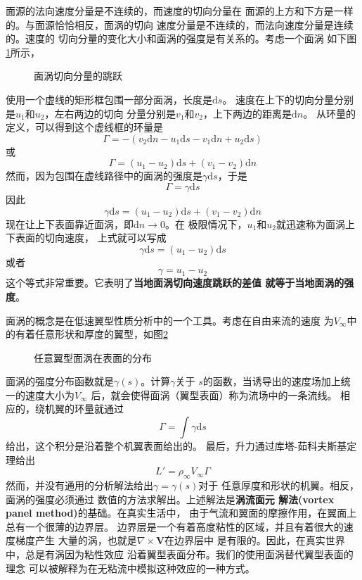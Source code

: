 面源的法向速度分量是不连续的，而速度的切向分量在
面源的上方和下方是一样的。与面源恰恰相反，面涡的切向
速度分量是不连续的，而法向速度分量是连续的。速度的
切向分量的变化大小和面涡的强度是有关系的。考虑一个面涡
如下图\ref{fig:strength_vortex}所示，
\begin{figure}[!ht]
  \centering
  
  \caption{面涡切向分量的跳跃}
  \label{fig:strength_vortex}
\end{figure}
使用一个虚线的矩形框包围一部分面涡，长度是$\mathrm{d}s $。
速度在上下的切向分量分别是$u_1$和$u_2$，左右两边的切向
分量分别是$v_1$和$v_2$，上下两边的距离是$\mathrm{d}n $。
从环量的定义，可以得到这个虚线框的环量是
\[
  \Gamma=-(v_2 \mathrm{d}n -u_1 \mathrm{d}s -v_1 \mathrm{d}n +u_2 \mathrm{d}s)
\]
或
\[
  \Gamma= (u_1-u_2) \mathrm{d}s+(v_1-v_2) \mathrm{d}n
\]
然而，因为包围在虚线路径中的面涡的强度是$\gamma \mathrm{d}s $，于是
\[
  \Gamma =\gamma \mathrm{d}s 
\]
因此
\[
  \gamma \mathrm{d} s =(u_1-u_2 )\mathrm{d}s+(v_1-v_2) \mathrm{d}n
\]
现在让上下表面靠近面涡，即$\mathrm{d}n \rightarrow 0$。在
极限情况下，$u_1$和$u_2$就迅速称为面涡上下表面的切向速度，
上式就可以写成
\[
  \gamma \mathrm{d}s =(u_1-u_2)\mathrm{d}s 
\]
或者
\[
  \gamma =u_1-u_2
\]
这个等式非常重要。它表明了{\bfseries 当地面涡切向速度跳跃的差值
就等于当地面涡的强度}。

面涡的概念是在低速翼型性质分析中的一个工具。考虑在自由来流的速度
为$V_\infty$中的有着任意形状和厚度的翼型，如图\ref{fig:distributing}
\begin{figure}[!ht]
  \centering
  
  \caption{任意翼型面涡在表面的分布}
  \label{fig:distributing}
\end{figure}
面涡的强度分布函数就是$\gamma(s)$。计算$\gamma$关于
$s$的函数，当诱导出的速度场加上统一的速度大小为$V_\infty$
后，就会使得面涡（翼型表面）称为流场中的一条流线。
相应的，绕机翼的环量就通过
\[
  \Gamma= \int \gamma \mathrm{d}s 
\]
给出，这个积分是沿着整个机翼表面给出的。
最后，升力通过库塔-茹科夫斯基定理给出
\[
  L'=\rho _\infty V_\infty \Gamma
\]
然而，并没有通用的分析解法给出$\gamma=\gamma(s)$对于
任意厚度和形状的机翼。相反，面涡的强度必须通过
数值的方法求解出。上述解法是{\bfseries 涡流面元
解法(vortex panel method)}的基础。在真实生活中，
由于气流和翼面的摩擦作用，在翼面上总有一个很薄的边界层。
边界层是一个有着高度粘性的区域，并且有着很大的速度梯度产生
大量的涡，也就是$\nabla \times \mathbf{V}$在边界层中
是有限的。因此，在真实世界中，总是有涡因为粘性效应
沿着翼型表面分布。我们的使用面涡替代翼型表面的理念
可以被解释为在无粘流中模拟这种效应的一种方式。

